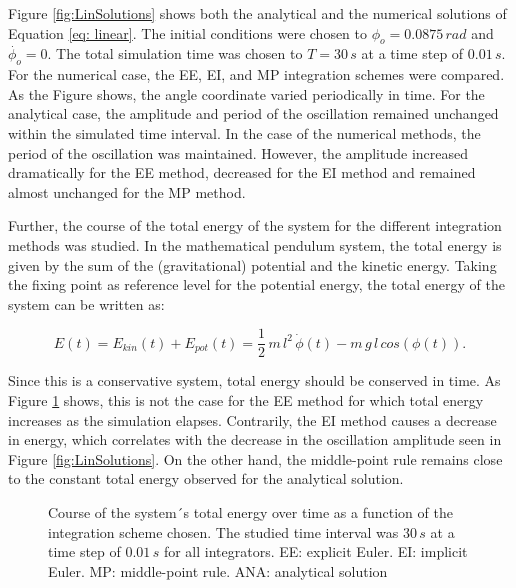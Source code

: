 \documentclass[12pt,bibstyle=none,pagenumberinfooter]{ifmdocument}
\begin{document}
Figure \ref{fig:LinSolutions} shows both the analytical and the numerical solutions of Equation \ref{eq: linear}. The initial conditions were chosen to $\phi_o = 0.0875\,rad$ and $\Dot{\phi_o}= 0$. The total simulation time was chosen to $T = 30\,s$ at a time step of $0.01\,s$. For the numerical case, the EE, EI, and MP integration schemes were compared. As the Figure shows, the angle coordinate varied periodically in time. For the analytical case, the amplitude and period of the oscillation remained unchanged within the simulated time interval. In the case of the numerical methods, the period of the oscillation was maintained. However, the amplitude increased dramatically for the EE method, decreased for the EI method and remained almost unchanged for the MP method.

Further, the course of the total energy of the system for the different integration methods was studied. In the mathematical pendulum system, the total energy is given by the sum of the (gravitational) potential and the kinetic energy. Taking the fixing point as reference level for the potential energy, the total energy of the system can be written as:

\begin{equation}
    E(t) = E_{kin}(t) + E_{pot}(t) = \frac{1}{2}\,m\,l^2\,\Dot{\phi}(t) - m\,g\,l\,cos\left(\phi(t)\right).
    \label{eq: energy}
\end{equation}

Since this is a conservative system, total energy should be conserved in time. As Figure \ref{fig: EnergyPlot} shows, this is not the case for the EE method for which total energy increases as the simulation elapses. Contrarily, the EI method causes a decrease in energy, which correlates with the decrease in the oscillation amplitude seen in Figure \ref{fig:LinSolutions}. On the other hand, the middle-point rule remains close to the constant total energy observed for the analytical solution.

\begin{figure}[h]
    \centering
    \setlength{\figH}{0.3\textheight}
    \setlength{\figW}{0.6\textwidth}
    
    \caption{Course of the system´s total energy over time as a function of the integration scheme chosen. The studied time interval was $30\,s$ at a time step of $0.01\,s$ for all integrators. EE: explicit Euler. EI: implicit Euler. MP: middle-point rule. ANA: analytical solution}
    \label{fig: EnergyPlot}
\end{figure}
\end{document}
